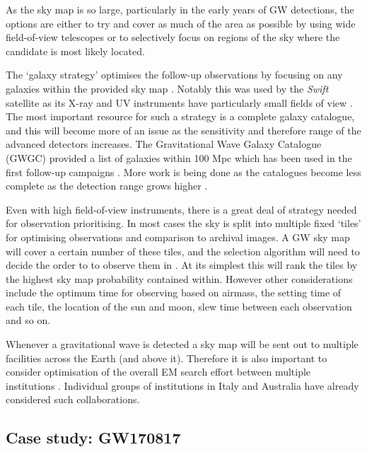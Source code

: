 \begin{colsection}
\begin{colsection}
As the sky map is so large, particularly in the early years of GW detections, the options are either to try and cover as much of the area as possible by using wide field-of-view telescopes or to selectively focus on regions of the sky where the candidate is most likely located.

The `galaxy strategy' optimises the follow-up observations by focusing on any galaxies within the provided sky map \citep{LIGO-galaxys}. Notably this was used by the \emph{Swift} satellite as its X-ray and UV instruments have particularly small fields of view \cite{LIGO-firstrun-Swift,GW150914followup-Swift}. The most important resource for such a strategy is a complete galaxy catalogue, and this will become more of an issue as the sensitivity and therefore range of the advanced detectors increases. The Gravitational Wave Galaxy Catalogue (GWGC) provided a list of galaxies within 100 Mpc \citep{LIGO-GWGC} which has been used in the first follow-up campaigns \citep{LIGO-firstrun-Swift,GW150914followup-Swift}. More work is being done as the catalogues become less complete as the detection range grows higher \citep{LIGO-galaxys,LIGO-galaxys2}.

Even with high field-of-view instruments, there is a great deal of strategy needed for observation prioritising. In most cases the sky is split into multiple fixed `tiles' for optimising observations and comparison to archival images. A GW sky map will cover a certain number of these tiles, and the selection algorithm will need to decide the order to to observe them in \citep{LIGO-tiles-dutch, LIGO-tiles-india}. At its simplest this will rank the tiles by the highest sky map probability contained within. However other considerations include the optimum time for observing based on airmass, the setting time of each tile, the location of the sun and moon, slew time between each observation and so on.

Whenever a gravitational wave is detected a sky map will be sent out to multiple facilities across the Earth (and above it). Therefore it is also important to consider optimisation of the overall EM search effort between multiple institutions \citep{LIGO-optimal,LIGO-optimal2}. Individual groups of institutions in Italy \citep{LIGO-italy} and Australia \citep{LIGO-aus} have already considered such collaborations. 

\end{colsection}


\subsection{Case study: GW170817}
\label{sec:gw170817}
\begin{colsection}


\end{colsection}


\end{colsection}

